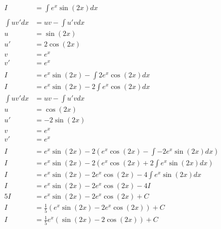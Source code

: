 \documentclass[12pt]{article}
\begin{document}
\begin{align}
    I           & = \int e^x \sin(2x) dx                                            \\
    \nonumber                                                                       \\
    \int uv' dx & = uv - \int u'v dx                                                \\
    u           & = \sin(2x)                                                        \\
    u'          & = 2\cos(2x)                                                       \\
    v           & = e^x                                                             \\
    v'          & = e^x                                                             \\
    \nonumber                                                                       \\
    I           & = e^x\sin(2x) - \int 2e^x\cos(2x) dx                              \\
    I           & = e^x\sin(2x) - 2\int e^x\cos(2x) dx                              \\
    \int uv' dx & = uv - \int u'v dx                                                \\
    u           & = \cos(2x)                                                        \\
    u'          & = -2\sin(2x)                                                      \\
    v           & = e^x                                                             \\
    v'          & = e^x                                                             \\
    \nonumber                                                                       \\
    I           & = e^x\sin(2x) - 2\left(e^x\cos(2x) - \int -2e^x\sin(2x) dx\right) \\
    I           & = e^x\sin(2x) - 2\left(e^x\cos(2x) + 2\int e^x\sin(2x) dx\right)  \\
    I           & = e^x\sin(2x) - 2e^x\cos(2x) - 4\int e^x\sin(2x) dx               \\
    I           & = e^x\sin(2x) - 2e^x\cos(2x) - 4I                                 \\
    5I          & = e^x\sin(2x) - 2e^x\cos(2x) + C                                  \\
    I           & = \frac{1}{5}(e^x\sin(2x) - 2e^x\cos(2x)) + C                     \\
    I           & = \frac{1}{5}e^x(\sin(2x) - 2\cos(2x)) + C
\end{align}
\end{document}
